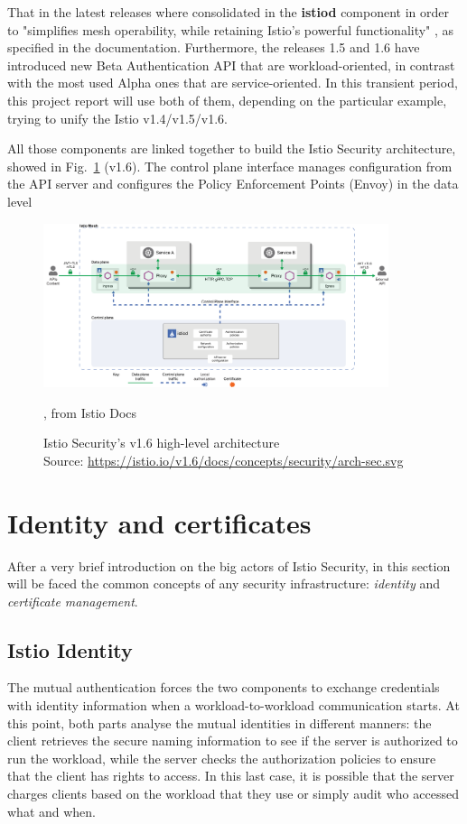 That in the latest releases where consolidated in the \textbf{istiod} component in order to "simplifies mesh operability, while retaining Istio’s powerful functionality" \cite{}, as specified in the documentation. Furthermore, the releases 1.5 and 1.6 have introduced new Beta Authentication API that are workload-oriented, in contrast with the most used Alpha ones that are service-oriented. In this transient period, this project report will use both of them, depending on the particular example, trying to unify the Istio v1.4/v1.5/v1.6.

All those components are linked together to build the Istio Security architecture, showed in Fig.~\ref{fig:hlarch} (v1.6). The control plane interface manages configuration from the API server and configures the Policy Enforcement Points (Envoy) in the data level

\begin{figure}
    \centering
    \includegraphics[width=0.9\textwidth]{chapters/images/chp1/arch-sec.png}
    \caption{, from Istio Docs}
    \caption[Istio Security's v1.6 high-level architecture]{Istio Security's v1.6 high-level architecture\\Source: \url{https://istio.io/v1.6/docs/concepts/security/arch-sec.svg}}
    \label{fig:hlarch}
\end{figure}

\section{Identity and certificates}
After a very brief introduction on the big actors of Istio Security, in this section will be faced the common concepts of any security infrastructure: \textit{identity} and \textit{certificate management}.

\subsection{Istio Identity}
The mutual authentication forces the two components to exchange credentials with identity information when a workload-to-workload communication starts. At this point, both parts analyse the mutual identities in different manners: the client retrieves the secure naming information to see if the server is authorized to run the workload, while the server checks the authorization policies to ensure that the client has rights to access. 
In this last case, it is possible that the server charges clients based on the workload that they use or simply audit who accessed what and when.

